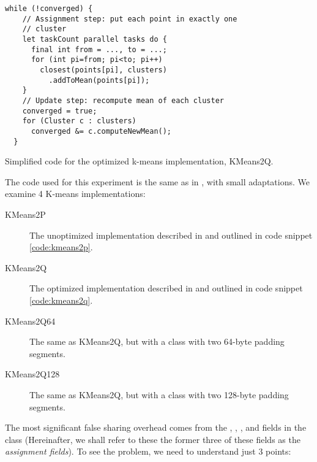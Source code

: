 \begin{code}
\begin{Verbatim}[frame=single]
  while (!converged) {
    // Assignment step: put each point in exactly one
    // cluster
    let taskCount parallel tasks do {
      final int from = ..., to = ...;
      for (int pi=from; pi<to; pi++)
        closest(points[pi], clusters)
          .addToMean(points[pi]);
    }
    // Update step: recompute mean of each cluster
    converged = true;
    for (Cluster c : clusters)
      converged &= c.computeNewMean();
  }

\end{Verbatim}
	\caption{Simplified code for the optimized k-means implementation, KMeans2Q.}
	\label{code:kmeans2q}
\end{code}

The code used for this experiment is the same as in \cite{mystery}, with small
adaptations. We examine 4 K-means implementations:

\begin{description}
	\item[KMeans2P] {The unoptimized implementation described
		in\cite{mystery} and outlined in code snippet
		\ref{code:kmeans2p}.}
	\item[KMeans2Q] {The optimized implementation described in \cite{mystery}
		and outlined in  code snippet \ref{code:kmeans2q}.}
	\item[KMeans2Q64] {The same as KMeans2Q, but with a  class
		with two 64-byte padding segments.}
	\item[KMeans2Q128] {The same as KMeans2Q, but with a  class
		with two 128-byte padding segments.}
\end{description}

The most significant false sharing overhead comes from the ,
, , and  fields in the 
class (Hereinafter, we shall refer to these the former three of these fields as
the \textit{assignment fields}). To see the problem, we need to understand just
3 points:

